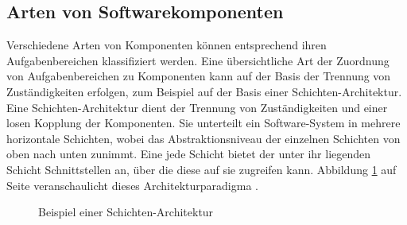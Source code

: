 \subsection{Arten von Softwarekomponenten}
\label{sec:2_Arten_Komponenten}

Verschiedene Arten von Komponenten können entsprechend ihren Aufgabenbereichen klassifiziert werden. Eine übersichtliche Art der Zuordnung von Aufgabenbereichen zu Komponenten kann auf der Basis der Trennung von Zuständigkeiten erfolgen, zum Beispiel auf der Basis einer Schichten-Architektur. Eine Schichten-Architektur dient der Trennung von Zuständigkeiten und einer losen Kopplung der Komponenten. Sie unterteilt ein Software-System in mehrere horizontale Schichten, wobei das Abstraktionsniveau der einzelnen Schichten von oben nach unten zunimmt. Eine jede Schicht bietet der unter ihr liegenden Schicht Schnittstellen an, über die diese auf sie zugreifen kann. Abbildung \ref{fig:2_Schichtenarchitektur} auf Seite \pageref{fig:2_Schichtenarchitektur} veranschaulicht dieses Architekturparadigma \citereset \autocite{Andresen.2003}.

\begin{figure}[h]
  \centering
  \qquad
  \caption[
    Beispiel einer Schichten-Architektur
  ]{
    Beispiel einer Schichten-Architektur
  }
  \label{fig:2_Schichtenarchitektur}
\end{figure}

